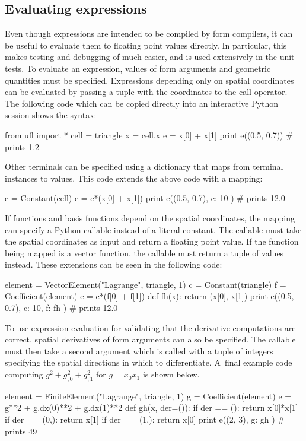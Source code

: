 \vspace*{-1.5pt}
\subsection{Evaluating expressions}
\label{ufl:sec:evaluating}

Even though \ufl{} expressions are intended to be compiled by form
compilers, it can be useful to evaluate them to floating point values
directly. In particular, this makes testing and debugging of \ufl{}
much easier, and is used extensively in the unit tests.  To evaluate an
\ufl{} expression, values of form arguments and geometric quantities
must be specified.  Expressions depending only on spatial coordinates
can be evaluated by passing a tuple with the coordinates to the call
operator. The following code which can be copied directly into an
interactive Python session shows the syntax:\vspace*{-3pt}
\begin{python}
from ufl import *
cell = triangle
x = cell.x
e = x[0] + x[1]
print e((0.5, 0.7)) # prints 1.2
\end{python}
Other terminals can be specified using a dictionary that maps from
terminal instances to values.  This code extends the above code with
a mapping:\vspace*{-3pt}
\begin{python}
c = Constant(cell)
e = c*(x[0] + x[1])
print e((0.5, 0.7), { c: 10 }) # prints 12.0
\end{python}
If functions and basis functions depend on the spatial coordinates, the
mapping can specify a Python callable instead of a literal constant.
The callable must take the spatial coordinates as input and return a
floating point value.  If the function being mapped is a vector function,
the callable must return a tuple of values instead.  These extensions
can be seen in the following code:\vspace*{-3pt}
\begin{python}
element = VectorElement("Lagrange", triangle, 1)
c = Constant(triangle)
f = Coefficient(element)
e = c*(f[0] + f[1])
def fh(x):
    return (x[0], x[1])
print e((0.5, 0.7), { c: 10, f: fh }) # prints 12.0
\end{python}
To use expression evaluation for validating that the derivative
computations are correct, spatial derivatives of form arguments can
also be specified.  The callable must then take a second argument which
is called with a tuple of integers specifying the spatial directions in
which to differentiate. A~final example code computing $g^2 + g_{,0}^2 +
g_{,1}^2$ for $g=x_0x_1$ is shown below.\vspace*{-3pt}
\begin{python}
element = FiniteElement("Lagrange", triangle, 1)
g = Coefficient(element)
e = g**2 + g.dx(0)**2 + g.dx(1)**2
def gh(x, der=()):
    if der == ():   return x[0]*x[1]
    if der == (0,): return x[1]
    if der == (1,): return x[0]
print e((2, 3), { g: gh }) # prints 49
\end{python}

